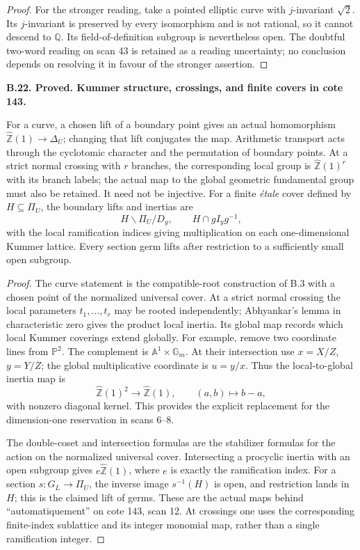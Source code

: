 \documentclass[11pt,oneside]{article}
\makeatletter
\newcounter{statementanchor}
\newenvironment{statement}[3]{%
 \refstepcounter{statementanchor}\def\@currentlabel{#1}%
 \par\addvspace{9pt}\noindent
 \textbf{#1. #2. #3.}\par\nobreak\noindent\ignorespaces
}{\par\addvspace{5pt}}
\makeatother
\begin{document}
\begin{proof}
For the stronger reading, take a pointed elliptic curve with
$j$-invariant $\sqrt2$.  Its $j$-invariant is preserved by every
isomorphism and is not rational, so it cannot descend to
$\mathbb Q$.  Its field-of-definition subgroup is nevertheless
open.  The doubtful two-word reading on scan 43 is retained as a
reading uncertainty; no conclusion depends on resolving it in
favour of the stronger assertion.
\end{proof}

\begin{statement}{B.22}{Proved}{Kummer structure, crossings, and finite covers in cote 143}
\label{st:B.22}

For a curve, a chosen lift of a boundary point gives an actual
homomorphism $\widehat{\mathbb Z}(1)\to\Delta_U$; changing that lift
conjugates the map.  Arithmetic transport acts through the
cyclotomic character and the permutation of boundary points.
At a strict normal crossing with $r$ branches, the corresponding
local group is $\widehat{\mathbb Z}(1)^r$ with its branch labels;
the actual map to the global geometric fundamental group must
also be retained.  It need not be injective.
For a finite \emph{\'etale} cover defined by $H\subseteq\Pi_U$,
the boundary lifts and inertias are
\[
 H\backslash\Pi_U/D_y,
 \qquad H\cap gI_yg^{-1},
\]
with the local ramification indices giving multiplication on each
one-dimensional Kummer lattice.  Every section germ lifts after
restriction to a sufficiently small open subgroup.
\end{statement}
\begin{proof}
The curve statement is the compatible-root construction of B.3
with a chosen point of the normalized universal cover.
At a strict normal crossing the local parameters
$t_1,\ldots,t_r$ may be rooted independently; Abhyankar's lemma
in characteristic zero gives the product local inertia.  Its
global map records which local Kummer coverings extend globally.
For example, remove two coordinate lines from $\mathbb P^2$.
The complement is $\mathbb A^1\times\mathbb G_m$.  At their
intersection use $x=X/Z$, $y=Y/Z$; the global multiplicative
coordinate is $u=y/x$.  Thus the local-to-global inertia map is
\[
 \widehat{\mathbb Z}(1)^2\longrightarrow\widehat{\mathbb Z}(1),
 \qquad (a,b)\longmapsto b-a,
\]
with nonzero diagonal kernel.  This provides the explicit
replacement for the dimension-one reservation in scans 6--8.

The double-coset and intersection formulas are the stabilizer
formulas for the action on the normalized universal cover.
Intersecting a procyclic inertia with an open subgroup gives
$e\widehat{\mathbb Z}(1)$, where $e$ is exactly the ramification
index.  For a section $s:G_L\to\Pi_U$, the inverse image
$s^{-1}(H)$ is open, and restriction lands in $H$; this is the
claimed lift of germs.  These are the actual maps behind
``automatiquement'' on cote 143, scan 12.  At crossings one uses
the corresponding finite-index sublattice and its integer
monomial map, rather than a single ramification integer.
\end{proof}
\end{document}
